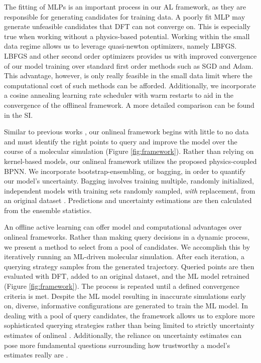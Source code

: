 \documentclass[%
 reprint,
 amsmath,amssymb,
 aps,
]{revtex4-2}
\begin{document}
The fitting of MLPs is an important process in our AL framework, as they are responsible for generating candidates for training data. A poorly fit MLP may generate unfeasible candidates that DFT can not converge on. This is especially true when working without a physics-based potential. Working within the small data regime allows us to leverage quasi-newton optimizers, namely LBFGS. LBFGS and other second order optimizers provides us with improved convergence of our model training over standard first order methods such as SGD and Adam. This advantage, however, is only really feasible in the small data limit where the computational cost of such methods can be afforded. Additionally, we incorporate a cosine annealing learning rate scheduler with warm restarts \cite{loshchilov2016sgdr} to aid in the convergence of the \gls{offlineal} framework. A more detailed comparison  can be found in the \gls{SI}.

Similar to previous works \cite{Vandermause2020, Jinnouchi2019, Jinnouchi2019}, our \gls{onlineal} framework begins with little to no data and must identify the right points to query and improve the model over the course of a molecular simulation (Figure \ref{fig:framework}). Rather than relying on kernel-based models, our \gls{onlineal} framework utilizes the proposed physics-coupled BPNN. We incorporate bootstrap-ensembling, or bagging, in order to quantify our model's uncertainty. Bagging involves training multiple, randomly initialized, independent models with training sets randomly sampled, \textit{with} replacement, from an original dataset \cite{Peterson2017}. Predictions and uncertainty estimations are then calculated from the ensemble statistics.

An offline active learning can offer model and computational advantages over \gls{onlineal} frameworks. Rather than making query decisions in a dynamic process, we present a method to select from a pool of candidates. We accomplish this by iteratively running an ML-driven molecular simulation. After each iteration, a querying strategy samples from the generated trajectory. Queried points are then evaluated with DFT, added to an original dataset, and the ML model retrained (Figure \ref{fig:framework}). The process is repeated until a defined convergence criteria is met. Despite the ML model resulting in inaccurate simulations early on, diverse, informative configurations are generated to train the ML model. In dealing with a pool of query candidates, the framework allows us to explore more sophisticated querying strategies rather than being limited to strictly uncertainty estimates of \gls{onlineal} \cite{Settles2010}. Additionally, the reliance on uncertainty estimates can pose more fundamental questions surrounding how trustworthy a model's estimates really are \cite{Tran2020}. 
\end{document}
